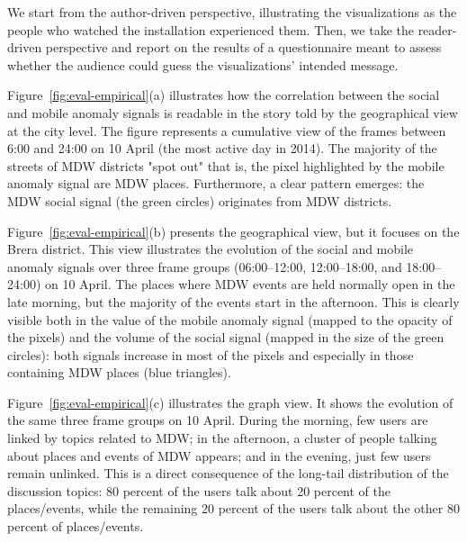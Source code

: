 We start from the author-driven perspective, illustrating the visualizations as the people who watched the installation experienced them. Then, we take the reader-driven perspective and report on the results of a questionnaire meant to assess whether the audience could guess the visualizations' intended message.

Figure~\ref{fig:eval-empirical}(a) illustrates how the correlation between the social and mobile anomaly signals is readable in the story told by the geographical view at the city level. The figure represents a cumulative view of the frames between 6:00 and 24:00 on 10 April (the most active day in 2014). The majority of the streets of MDW districts "spot out" that is, the pixel highlighted by the mobile anomaly signal are MDW places. Furthermore, a clear pattern emerges: the MDW social signal (the green circles) originates from MDW districts.

Figure~\ref{fig:eval-empirical}(b) presents the geographical view, but it focuses on the Brera district. This view illustrates the evolution of the social and mobile anomaly signals over three frame groups (06:00--12:00, 12:00--18:00, and 18:00--24:00) on 10 April. The places where MDW events are held normally open in the late morning, but the majority of the events start in the afternoon. This is clearly visible both in the value of the mobile anomaly signal (mapped to the opacity of the pixels) and the volume of the social signal (mapped in the size of the green circles): both signals increase in most of the pixels and especially in those containing MDW places (blue triangles).

Figure~\ref{fig:eval-empirical}(c) illustrates the graph view. It shows the evolution of the same three frame groups on 10 April. During the morning, few users are linked by topics related to MDW; in the afternoon, a cluster of people talking about places and events of MDW appears; and in the evening, just few users remain unlinked. This is a direct consequence of the long-tail distribution of the discussion topics: 80 percent of the users talk about 20 percent of the places/events, while the remaining 20 percent of the users talk about the other 80 percent of places/events.

